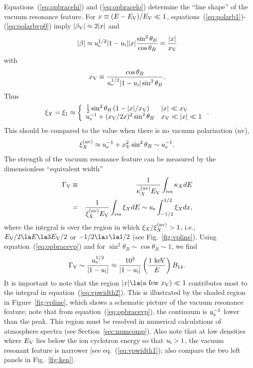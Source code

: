 \documentclass{mn2e}
\newcommand{\be}{\begin{equation}}
\newcommand{\ee}{\end{equation}}
\newcommand{\ba}{\begin{eqnarray}}
\newcommand{\ea}{\end{eqnarray}}
\newcommand{\lp}{\left(}
\newcommand{\rp}{\right)}
\newcommand{\thetab}{\theta_B}
\newcommand{\polarb}{\beta}
\newcommand{\uel}{u_{\rm e}}
\newcommand{\uion}{u_{\rm i}}
\newcommand{\opbrace}{\xi}
\newcommand{\Evp}{E_{\rm V}}
\newcommand{\polarbvp}{\beta_{\rm V}}
\newcommand{\Gammavp}{\Gamma_{\rm V}}
\begin{document}
{Equations~(\ref{eq:opbracehi}) and (\ref{eq:opbracelo}) determine
the ``line shape'' of the vacuum resonance feature.
For $x\equiv(E-\Evp)/\Evp\ll 1$,
equations~(\ref{eq:polarb1})-(\ref{eq:polarbvp0}) imply
$|\polarbvp|\approx 2|x|$ and
\be
|\polarb|\approx\uel^{1/2}|1-\uion||x|\frac{\sin^2\thetab}{\cos\thetab}
=\frac{|x|}{x_{\rm V}} \label{eq:vpbetares}
\ee
with
\be
x_{\rm V}\equiv\frac{\cos\thetab}{\uel^{1/2}|1-\uion|\sin^2\thetab}.
\label{eq:vpwidth1}
\ee
Thus
\be
\opbrace_X=\opbrace_1\approx
 \left\{ \begin{array}{ll}
 \frac{1}{2}\sin^2\thetab\lp 1-|x|/x_{\rm V}\rp
 & |x|\ll x_{\rm V} \\
 \uel^{-1}+(x_{\rm V}/2x)^2\sin^2\thetab
 & x_{\rm V} \ll |x| \ll 1
 \end{array} \right. . \label{eq:opbracevp}
\ee
This should be compared to the value when there is no vacuum
polarization (nv),
\be
\opbrace_X^{(\rm nv)} \approx \uel^{-1} +x_{\rm V}^2\sin^2\thetab
 \sim \uel^{-1}.  \label{eq:opbracenvp}
\ee
The strength of the vacuum resonance feature
can be measured by the dimensionless ``equivalent width''
\ba
\Gammavp & \equiv & \frac{1}{\kappa_X^{(\rm nv)}\Evp}\int_{\rm res}\kappa_X dE
 \nonumber \\
 & = & \frac{1}{\opbrace_X^{(\rm nv)}\Evp}\int_{\rm res}\opbrace_X dE
 \sim \uel\int_{-1/2}^{1/2}\opbrace_X dx, \label{eq:vpwidth2}
\ea
where the integral is over the region in which
$\opbrace_X/\opbrace_X^{(\rm nv)}>1$,
i.e., $\Evp/2\la E\la 3\Evp/2$ or $-1/2\la x\la 1/2$
(see Fig.~\ref{fig:vpline}).
Using equation~(\ref{eq:opbracevp}) and for
$\sin^2\thetab\sim\cos\thetab\sim 1$, we find
\be
\Gammavp \sim \frac{\uel^{1/2}}{|1-\uion|} \approx \frac{10^3}{|1-\uion|}
 \lp\frac{\mbox{1 keV}}{E}\rp B_{14}.  \label{eq:vpwidth3}
\ee
It is important to note that the region $|x|\la(\mbox{a few }x_{\rm V})\ll 1$
contributes most to the integral in equation~(\ref{eq:vpwidth2}).
This is illustrated by the shaded region in Figure~\ref{fig:vpline},
which shows a schematic picture of the vacuum
resonance feature; note that from equation~(\ref{eq:opbracevp}),
the continuum is $\uel^{-1}$ lower than the peak.
This region must be resolved in numerical calculations of
atmosphere spectra (see Section~\ref{sec:numcomp}).
Also note that at low densities where $\Evp$ lies below the ion
cyclotron energy so that $\uion > 1$, the vacuum resonant feature
is narrower [see eq.~(\ref{eq:vpwidth1}); also compare the two
left panels in Fig.~\ref{fig:ken}].

}
\end{document}
